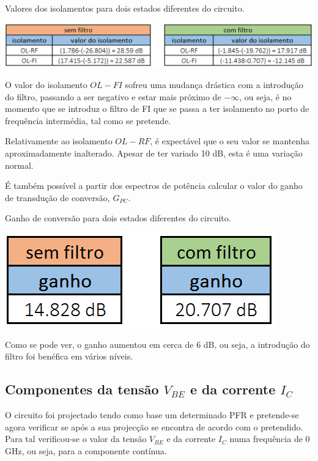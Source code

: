 \documentclass[11pt]{article}
\numberwithin{equation}{section}
\begin{document}
\pagebreak

\begin{table}[h]
	\centering
	\caption{Valores dos isolamentos para dois estados diferentes do circuito.}
	\vspace{-1.5mm}
	\includegraphics[keepaspectratio=true, scale=0.40]{teoricas/isolamentosSemComFiltro}
\end{table}

O valor do isolamento $OL - FI$ sofreu uma mudança drástica com a introdução do filtro, passando a ser negativo e estar mais próximo de  $- \infty$, ou seja, é no momento que se introduz o filtro de FI que se passa a ter isolamento no porto de frequência intermédia, tal como se pretende. 

Relativamente ao isolamento $OL - RF$, é expectável que o seu valor se mantenha aproximadamente inalterado. Apesar de ter variado 10 dB, esta é uma variação normal. 

É também possível a partir dos espectros de potência calcular o valor do ganho de transdução de conversão, $G_{PC}$.

\begin{table}[h]
	\centering
	\caption{Ganho de conversão para dois estados diferentes do circuito.}
	\vspace{-1.5mm}
	\includegraphics[keepaspectratio=true, scale=0.40]{teoricas/ganhoSemComFiltro}
\end{table}

Como se pode ver, o ganho aumentou em cerca de 6 dB, ou seja, a introdução do filtro foi benéfica em vários níveis.

\subsection{Componentes da tensão $V_{BE}$ e da corrente $I_{C}$} 

O circuito foi projectado tendo como base um determinado PFR e pretende-se agora verificar se após a sua projecção se encontra de acordo com o pretendido. Para tal verificou-se o valor da tensão $V_{BE}$ e da corrente $I_{C}$ numa frequência de 0 GHz, ou seja, para a componente contínua.
\end{document}

